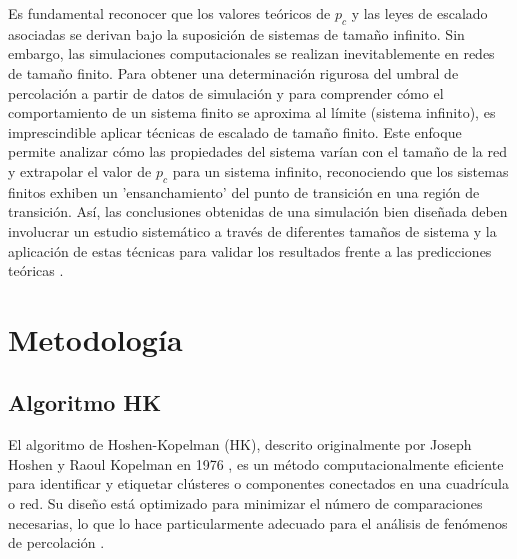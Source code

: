 \documentclass[12pt,a4paper]{article}
\begin{document}
Es fundamental reconocer que los valores teóricos de $p_c$
y las leyes de escalado asociadas se derivan bajo la suposición de sistemas de tamaño infinito. Sin embargo, las simulaciones computacionales se realizan inevitablemente en redes de tamaño finito. Para obtener una determinación rigurosa del umbral de percolación a partir de datos de simulación y para comprender cómo el comportamiento de un sistema finito se aproxima al límite (sistema infinito), es imprescindible aplicar técnicas de escalado de tamaño finito. Este enfoque permite analizar cómo las propiedades del sistema varían con el tamaño de la red y extrapolar el valor de $p_c$ para un sistema infinito, reconociendo que los sistemas finitos exhiben un 'ensanchamiento' del punto de transición en una región de transición. Así, las conclusiones obtenidas de una simulación bien diseñada deben involucrar un estudio sistemático a través de diferentes tamaños de sistema y la aplicación de estas técnicas para validar los resultados frente a las predicciones teóricas \cite{PERCentralPercolation}.

\section{Metodología}

\subsection{Algoritmo HK}
El algoritmo de Hoshen-Kopelman (HK), descrito originalmente por Joseph Hoshen y Raoul Kopelman en 1976 , es un método computacionalmente eficiente para identificar y etiquetar clústeres o componentes conectados en una cuadrícula o red. Su diseño está optimizado para minimizar el número de comparaciones necesarias, lo que lo hace particularmente adecuado para el análisis de fenómenos de percolación \cite{OntosightAINd}.
\end{document}
